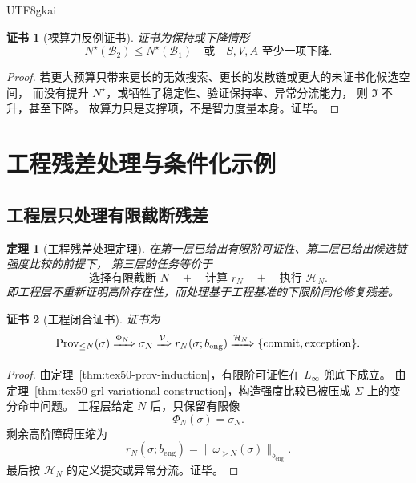 \documentclass[12pt]{article}
\newtheorem{theorem}{定理}[section]
\newtheorem{Certificate}{证书}[section]
\newcommand{\Linfty}{\ensuremath{L_\infty}}
\newcommand{\Prov}{\operatorname{Prov}}
\begin{document}
\begin{CJK*}{UTF8}{gkai}
\begin{Certificate}[裸算力反例证书]
证书为保持或下降情形
\[
  N^\star(\mathcal B_2)\le N^\star(\mathcal B_1)
  \quad\text{或}\quad
  S,V,A\text{ 至少一项下降}.
\]
\end{Certificate}

\begin{proof}
若更大预算只带来更长的无效搜索、更长的发散链或更大的未证书化候选空间，
而没有提升 $N^\star$，或牺牲了稳定性、验证保持率、异常分流能力，
则 $\mathfrak I$ 不升，甚至下降。
故算力只是支撑项，不是智力度量本身。证毕。
\end{proof}

\clearpage

\section{工程残差处理与条件化示例}
\label{sec:tex50-engineering-examples}

\subsection{工程层只处理有限截断残差}
\label{subsec:tex50-engineering-residual}

\begin{theorem}[工程残差处理定理]
\label{thm:tex50-engineering-residual}
在第一层已给出有限阶可证性、第二层已给出候选链强度比较的前提下，
第三层的任务等价于
\[
  \text{选择有限截断 }N
  \quad+\quad
  \text{计算 }r_N
  \quad+\quad
  \text{执行 }\mathcal H_N.
\]
即工程层不重新证明高阶存在性，而处理基于工程基准的下限阶同伦修复残差。
\end{theorem}

\begin{Certificate}[工程闭合证书]
证书为
\[
  \Prov_{\le N}(\sigma)
  \xRightarrow{\Phi_N}
  \sigma_N
  \xRightarrow{\mathcal V}
  r_N(\sigma;b_{\mathrm{eng}})
  \xRightarrow{\mathcal H_N}
  \{\mathrm{commit},\mathrm{exception}\}.
\]
\end{Certificate}

\begin{proof}
由定理~\ref{thm:tex50-prov-induction}，有限阶可证性在 \Linfty{} 兜底下成立。
由定理~\ref{thm:tex50-grl-variational-construction}，构造强度比较已被压成 $\Sigma$ 上的变分命中问题。
工程层给定 $N$ 后，只保留有限像
\[
  \Phi_N(\sigma)=\sigma_N.
\]
剩余高阶障碍压缩为
\[
  r_N(\sigma;b_{\mathrm{eng}})=\|\omega_{>N}(\sigma)\|_{b_{\mathrm{eng}}}.
\]
最后按 $\mathcal H_N$ 的定义提交或异常分流。证毕。
\end{proof}


\end{CJK*}
\end{document}
